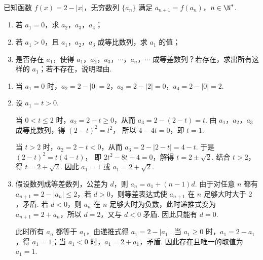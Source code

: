 \begin{problem}
已知函数 \(f(x) = 2 - |x|\)，无穷数列 \(\{a_n\}\) 满足 \(a_{n+1} = f(a_n)\)，\(n \in \N^*\).

\begin{enumerate}
\item 若 \(a_1 = 0\)，求 \(a_2\)，\(a_3\)，\(a_4\)；
\item 若 \(a_1 > 0\)，且 \(a_1\)，\(a_2\)，\(a_3\) 成等比数列，求 \(a_1\) 的值；
\item 是否存在 \(a_1\)，使得 \(a_1\)，\(a_2\)，\(a_3\)，\(\cdots\)，\(a_n\)，\(\cdots\) 成等差数列？若存在，求出所有这样的 \(a_1\)；若不存在，说明理由.
\end{enumerate}

\begin{solution}
\begin{enumerate}
\item 当 \(a_1=0\) 时，\(a_2=2-|0|=2\)，\(a_3=2-|2|=0\)，\(a_4=2-|0|=2\).
\item 设 \(a_1=t>0\).

当 \(0<t\leqslant2\) 时，\(a_2=2-t\geqslant0\)，从而 \(a_3=2-(2-t)=t\). 由 \(a_1\)，\(a_2\)，\(a_3\) 成等比数列，得 \((2-t)^2=t^2\)，
所以 \(4-4t=0\)，即 \(t=1\).

当 \(t>2\) 时，\(a_2=2-t<0\)，从而 \(a_3=2-|2-t|=4-t\). 于是 \((2-t)^2=t(4-t)\)，
即 \(2t^2-8t+4=0\)，解得 \(t=2\pm\sqrt{2}\). 结合 \(t>2\)，得 \(t=2+\sqrt{2}\). 因此 \(a_1=1\) 或 \(a_1=2+\sqrt{2}\).
\item 假设数列成等差数列，公差为 \(d\)，则 \(a_n=a_1+(n-1)d\). 由于对任意 \(n\) 都有 \(a_{n+1}=2-|a_n|\leqslant2\)，若 \(d>0\)，则等差表达式使 \(a_{n+1}\) 在 \(n\) 足够大时大于 \(2\)，矛盾. 若 \(d<0\)，则 \(a_n\) 在 \(n\) 足够大时为负数，此时递推式变为 \(a_{n+1}=2+a_n\)，所以 \(d=2\)，又与 \(d<0\) 矛盾. 因此只能有 \(d=0\).

此时所有 \(a_n\) 都等于 \(a_1\)，由递推式得 \(a_1=2-|a_1|\). 当 \(a_1\geqslant0\) 时，\(a_1=2-a_1\)，得 \(a_1=1\)；当 \(a_1<0\) 时，\(a_1=2+a_1\)，矛盾. 因此存在且唯一的取值为 \(a_1=1\).
\end{enumerate}
\end{solution}
\end{problem}

